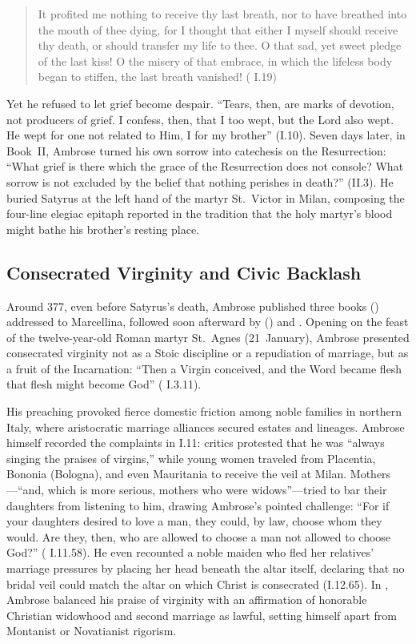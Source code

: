 \begin{quote}
It profited me nothing to receive thy last breath, nor to have breathed into the mouth of thee dying, for I thought that either I myself should receive thy death, or should transfer my life to thee. O that sad, yet sweet pledge of the last kiss! O the misery of that embrace, in which the lifeless body began to stiffen, the last breath vanished! ( I.19)
\end{quote}

Yet he refused to let grief become despair. ``Tears, then, are marks of devotion, not producers of grief. I confess, then, that I too wept, but the Lord also wept. He wept for one not related to Him, I for my brother'' (I.10). Seven days later, in Book~II, Ambrose turned his own sorrow into catechesis on the Resurrection: ``What grief is there which the grace of the Resurrection does not console? What sorrow is not excluded by the belief that nothing perishes in death?'' (II.3). He buried Satyrus at the left hand of the martyr St.~Victor in Milan, composing the four-line elegiac epitaph reported in the tradition that the holy martyr's blood might bathe his brother's resting place.

\subsection{Consecrated Virginity and Civic Backlash}

Around 377, even before Satyrus's death, Ambrose published three books  () addressed to Marcellina, followed soon afterward by  () and . Opening  on the feast of the twelve-year-old Roman martyr St.~Agnes (21~January), Ambrose presented consecrated virginity not as a Stoic discipline or a repudiation of marriage, but as a fruit of the Incarnation: ``Then a Virgin conceived, and the Word became flesh that flesh might become God'' ( I.3.11).

His preaching provoked fierce domestic friction among noble families in northern Italy, where aristocratic marriage alliances secured estates and lineages. Ambrose himself recorded the complaints in  I.11: critics protested that he was ``always singing the praises of virgins,'' while young women traveled from Placentia, Bononia (Bologna), and even Mauritania to receive the veil at Milan. Mothers---``and, which is more serious, mothers who were widows''---tried to bar their daughters from listening to him, drawing Ambrose's pointed challenge: ``For if your daughters desired to love a man, they could, by law, choose whom they would. Are they, then, who are allowed to choose a man not allowed to choose God?'' ( I.11.58). He even recounted a noble maiden who fled her relatives' marriage pressures by placing her head beneath the altar itself, declaring that no bridal veil could match the altar on which Christ is consecrated (I.12.65). In , Ambrose balanced his praise of virginity with an affirmation of honorable Christian widowhood and second marriage as lawful, setting himself apart from Montanist or Novatianist rigorism.

